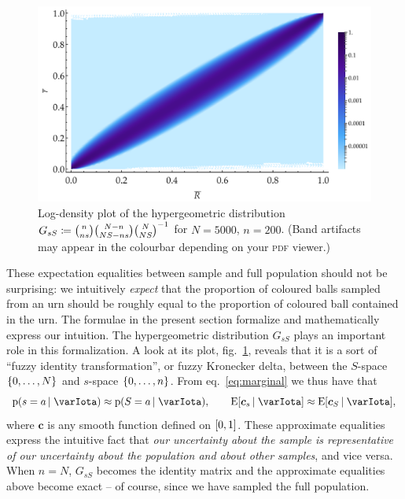 \documentclass[\ifafour a4paper,12pt,\else a5paper,10pt,\fi%
onecolumn,oneside,article,%
british%
]{memoir}
\theoremstyle{remark}
\theoremstyle{innote}
\newcommand*{\defd}{\coloneqq}
\DeclarePairedDelimiter\clcl{[}{]}
\DeclarePairedDelimiter\set{\{}{\}}
\newcommand*{\pf}{\mathrm{p}}%
\newcommand*{\E}{\mathrm{E}}
\renewcommand*{\|}{\nonscript\,\vert\nonscript\;\mathopen{}}
\newcommand*{\eqn}{eq.}%
\newcommand*{\fig}{fig.}%
\newcommand*{\ypp}{G}
\newcommand*{\yRv}{S}
\newcommand*{\yrv}{s}
\newcommand*{\yNv}{N}
\newcommand*{\yrs}{\yrv}%
\newcommand*{\yRf}{\yRv}%
\newcommand*{\yH}{\varIota}
\newcommand*{\yg}{\bm{c}}
\begin{document}
\bigskip


\begin{figure}[!b]
\centering
\includegraphics[width=\linewidth]{pop_sample_projection3.pdf}%
\caption{Log-density plot of the hypergeometric distribution
  $%
\ypp_{\yrs\yRf} \defd  \raisebox{0pt}[0pt][1ex]{}\binom{n}{n\yrs}\binom{\yNv-n}{\yNv \yRf-n\yrs}\binom{\yNv}{\yNv \yRf}^{-1}$ for $\yNv=5000$, $n=200$. (Band artifacts may appear in the
  colourbar depending on your \textsc{pdf} viewer.)}
\label{fig:hypergeom_proj}
\end{figure}%
These expectation equalities between sample and full population should not
be surprising: we intuitively \emph{expect} that the proportion of coloured
balls sampled from an urn should be roughly equal to the proportion of
coloured ball contained in the urn. The formulae in the present section
formalize and mathematically express our intuition. The hypergeometric
distribution $\ypp_{\yrs\yRf}$ plays an important role in this
formalization. A look at its plot, \fig~\ref{fig:hypergeom_proj}, reveals
that it is a sort of \enquote{fuzzy identity transformation}, or fuzzy
Kronecker delta, between the $\yRf$-space $\set{0,\dotsc,\yNv}$ and
$\yrs$-space $\set{0,\dotsc,n}$. From \eqn~\eqref{eq:marginal} we thus have
that
\begin{equation}
  \label{eq:roughly_equal_nN}
  \pf(\yrs=a \|\yH) \approx \pf(\yRf=a \|\yH),\qquad
\E[\yg_{\yrs} \|\yH] \approx \E[\yg_{\yRf} \|\yH],
\end{equation}
where $\yg$ is any smooth function defined on $\clcl{0,1}$. These approximate
equalities express the intuitive fact that \emph{our uncertainty about the
  sample is representative of our uncertainty about the population and
  about other samples}, and vice versa. When $n=\yNv$, $\ypp_{\yrs\yRf}$
becomes the identity matrix and the approximate equalities above become
exact -- of course, since we have sampled the full population.
\end{document}
